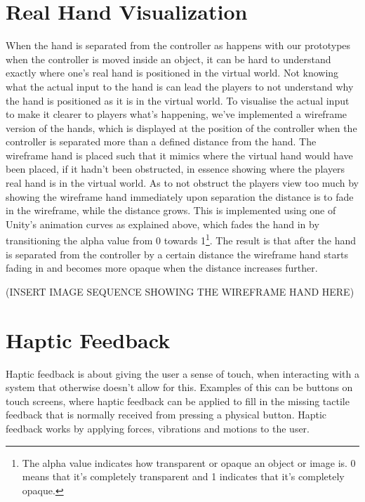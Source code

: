 \section{Real Hand Visualization}
\label{sec:handVisualization}
When the hand is separated from the controller as happens with our prototypes when the controller is moved inside an object, it can be hard to understand exactly where one's real hand is positioned in the virtual world. Not knowing what the actual input to the hand is can lead the players to not understand why the hand is positioned as it is in the virtual world. To visualise the actual input to make it clearer to players what's happening, we've implemented a wireframe version of the hands, which is displayed at the position of the controller when the controller is separated more than a defined distance from the hand. The wireframe hand is placed such that it mimics where the virtual hand would have been placed, if it hadn't been obstructed, in essence showing where the players real hand is in the virtual world. As to not obstruct the players view too much by showing the wireframe hand immediately upon separation the distance is to fade in the wireframe, while the distance grows. This is implemented using one of Unity's animation curves as explained above, which fades the hand in by transitioning the alpha value from 0 towards 1\footnote{The alpha value indicates how transparent or opaque an object or image is. 0 means that it's completely transparent and 1 indicates that it's completely opaque.}. The result is that after the hand is separated from the controller by a certain distance the wireframe hand starts fading in and becomes more opaque when the distance increases further.

(INSERT IMAGE SEQUENCE SHOWING THE WIREFRAME HAND HERE)

\section{Haptic Feedback}
\label{sec:hapticFeedback}
Haptic feedback is about giving the user a sense of touch, when interacting with a system that otherwise doesn't allow for this. Examples of this can be buttons on touch screens, where haptic feedback can be applied to fill in the missing tactile feedback that is normally received from pressing a physical button. Haptic feedback works by applying forces, vibrations and motions to the user.

